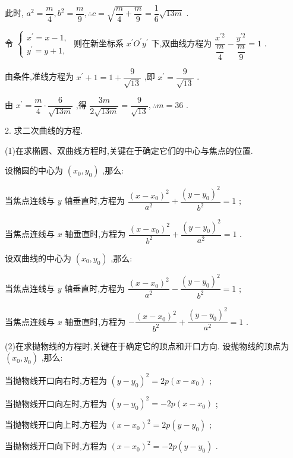 此时, ${a}^{2} = \dfrac{m}{4},{b}^{2} = \dfrac{m}{9},\therefore c = \sqrt{\dfrac{m}{4} + \dfrac{m}{9}} = \dfrac{1}{6}\sqrt{13m}$ .

令 $\left\{  \begin{array}{l} {x}^{\prime } = x - 1, \\  {y}^{\prime } = y + 1, \end{array}\right.$ 则在新坐标系 ${x}^{\prime }{O}^{\prime }{y}^{\prime }$ 下,双曲线方程为 $\dfrac{{x}^{\prime 2}}{\dfrac{m}{4}} - \dfrac{{y}^{\prime 2}}{\dfrac{m}{9}} = 1$ .

由条件,准线方程为 ${x}^{\prime } + 1 = 1 + \dfrac{9}{\sqrt{13}}$ ,即 ${x}^{\prime } = \dfrac{9}{\sqrt{13}}$ .

由 ${x}^{\prime } = \dfrac{m}{4} \cdot  \dfrac{6}{\sqrt{13m}}$ ,得 $\dfrac{3m}{2\sqrt{13m}} = \dfrac{9}{\sqrt{13}},\therefore m = {36}$ .

2. 求二次曲线的方程.

(1)在求椭圆、双曲线方程时,关键在于确定它们的中心与焦点的位置.

设椭圆的中心为 $\left( {{x}_{0},{y}_{0}}\right)$ ,那么:

当焦点连线与 $y$ 轴垂直时,方程为 $\dfrac{{\left( x - {x}_{0}\right) }^{2}}{{a}^{2}} + \dfrac{{\left( y - {y}_{0}\right) }^{2}}{{b}^{2}} = 1$ ;

当焦点连线与 $x$ 轴垂直时,方程为 $\dfrac{{\left( x - {x}_{0}\right) }^{2}}{{b}^{2}} + \dfrac{{\left( y - {y}_{0}\right) }^{2}}{{a}^{2}} = 1$ .

设双曲线的中心为 $\left( {{x}_{0},{y}_{0}}\right)$ ,那么:

当焦点连线与 $y$ 轴垂直时,方程为 $\dfrac{{\left( x - {x}_{0}\right) }^{2}}{{a}^{2}} - \dfrac{{\left( y - {y}_{0}\right) }^{2}}{{b}^{2}} = 1$ ;

当焦点连线与 $x$ 轴垂直时,方程为 $- \dfrac{{\left( x - {x}_{0}\right) }^{2}}{{b}^{2}} + \dfrac{{\left( y - {y}_{0}\right) }^{2}}{{a}^{2}} = 1$ .

(2)在求抛物线的方程时,关键在于确定它的顶点和开口方向. 设抛物线的顶点为 $\left( {{x}_{0},{y}_{0}}\right)$ ,那么:

当抛物线开口向右时,方程为 ${\left( y - {y}_{0}\right) }^{2} = {2p}\left( {x - {x}_{0}}\right)$ ;

当抛物线开口向左时,方程为 ${\left( y - {y}_{0}\right) }^{2} =  - {2p}\left( {x - {x}_{0}}\right)$ ;

当抛物线开口向上时,方程为 ${\left( x - {x}_{0}\right) }^{2} = {2p}\left( {y - {y}_{0}}\right)$ ;

当抛物线开口向下时,方程为 ${\left( x - {x}_{0}\right) }^{2} =  - {2p}\left( {y - {y}_{0}}\right)$ .


